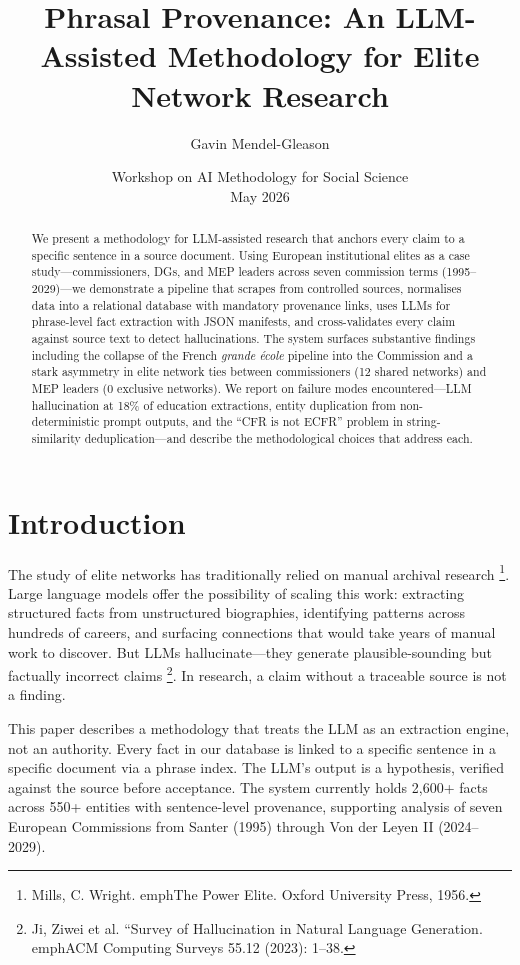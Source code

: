\documentclass[11pt,a4paper]{article}
\title{Phrasal Provenance: An LLM-Assisted Methodology for Elite Network Research}
\author{Gavin Mendel-Gleason}
\date{Workshop on AI Methodology for Social Science \\ May 2026}
\begin{document}
\maketitle

\begin{abstract}
We present a methodology for LLM-assisted research that anchors every claim to a specific sentence in a source document. Using European institutional elites as a case study---commissioners, DGs, and MEP leaders across seven commission terms (1995--2029)---we demonstrate a pipeline that scrapes from controlled sources, normalises data into a relational database with mandatory provenance links, uses LLMs for phrase-level fact extraction with JSON manifests, and cross-validates every claim against source text to detect hallucinations. The system surfaces substantive findings including the collapse of the French \emph{grande \'ecole} pipeline into the Commission and a stark asymmetry in elite network ties between commissioners (12 shared networks) and MEP leaders (0 exclusive networks). We report on failure modes encountered---LLM hallucination at 18\% of education extractions, entity duplication from non-deterministic prompt outputs, and the ``CFR is not ECFR'' problem in string-similarity deduplication---and describe the methodological choices that address each.
\end{abstract}

\section{Introduction}

The study of elite networks has traditionally relied on manual archival research \footnote{Mills, C. Wright. emph{The Power Elite}. Oxford University Press, 1956.}. Large language models offer the possibility of scaling this work: extracting structured facts from unstructured biographies, identifying patterns across hundreds of careers, and surfacing connections that would take years of manual work to discover. But LLMs hallucinate---they generate plausible-sounding but factually incorrect claims \footnote{Ji, Ziwei et al. ``Survey of Hallucination in Natural Language Generation. emph{ACM Computing Surveys} 55.12 (2023): 1--38.}. In research, a claim without a traceable source is not a finding.

This paper describes a methodology that treats the LLM as an extraction engine, not an authority. Every fact in our database is linked to a specific sentence in a specific document via a phrase index. The LLM's output is a hypothesis, verified against the source before acceptance. The system currently holds 2,600+ facts across 550+ entities with sentence-level provenance, supporting analysis of seven European Commissions from Santer (1995) through Von der Leyen II (2024--2029).
\end{document}
